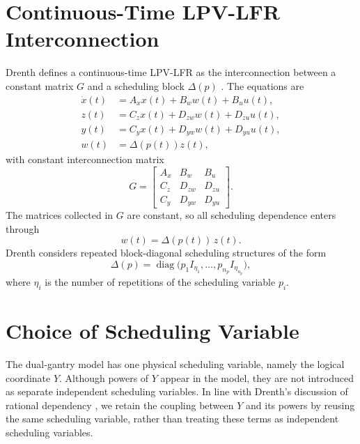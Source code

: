 \documentclass[11pt]{article}
\newcommand{\diag}{\operatorname{diag}}
\begin{document}
\section{Continuous-Time LPV-LFR Interconnection}
Drenth defines a continuous-time LPV-LFR as the interconnection between a
constant matrix $G$ and a scheduling block $\Delta(p)$
\cite{drenth2025thesis}. The equations are
\begin{align}
    \dot{x}(t) &= A_x x(t) + B_w w(t) + B_u u(t),
    \label{eqs:lfrstate} \\
    z(t) &= C_z x(t) + D_{zw} w(t) + D_{zu} u(t),
    \label{eqs:lfrz} \\
    y(t) &= C_y x(t) + D_{yw} w(t) + D_{yu} u(t),
    \label{eqs:lfry} \\
    w(t) &= \Delta(p(t)) z(t),
    \label{eqs:lfrw}
\end{align}
with constant interconnection matrix
\begin{equation}
    G =
    \begin{bmatrix}
        A_x & B_w & B_u \\
        C_z & D_{zw} & D_{zu} \\
        C_y & D_{yw} & D_{yu}
    \end{bmatrix}.
    \label{eqs:G}
\end{equation}
The matrices collected in $G$ are constant, so all scheduling dependence enters
through
\[
w(t)=\Delta(p(t))\,z(t).
\]
Drenth considers repeated block-diagonal scheduling structures of the form
\begin{equation}
    \Delta(p) =
    \diag\!\bigl(p_1 I_{\eta_1}, \dots, p_{n_p} I_{\eta_{n_p}}\bigr),
    \label{eqs:deltageneric}
\end{equation}
where $\eta_i$ is the number of repetitions of the scheduling variable $p_i$.


\section{Choice of Scheduling Variable}
The dual-gantry model has one physical scheduling variable, namely the logical
coordinate $Y$. Although powers of $Y$ appear in the model, they are not
introduced as separate independent scheduling variables. In line with Drenth's discussion of rational dependency
\cite{drenth2025thesis}, we retain the coupling between $Y$ and its powers by
reusing the same scheduling variable, rather than treating these terms as
independent scheduling variables.
\end{document}
